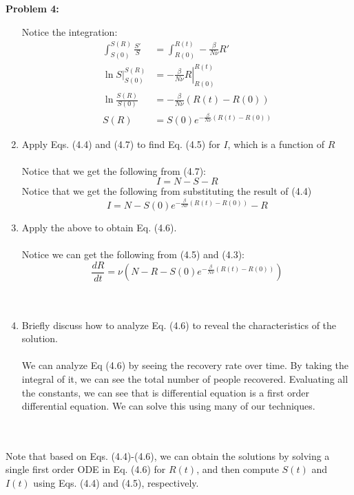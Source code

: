 \documentclass[11pt]{article}
\newenvironment{problem}[1]{\textbf{Problem #1: }}{\newpage}
\begin{document}
\begin{problem}{4}
\begin{enumerate}[label = (\alph*)]
			Notice the integration:
			\begin{align*}
				\int_{S(0)}^{S(R)}\frac{S'}{S} &= \int_{R(0)}^{R(t)}-\frac{\beta}{N \nu}R'\\
				\ln S\bigg|_{S(0)}^{S(R)} &= \left.-\frac{\beta}{N \nu}R\right|_{R(0)}^{R(t)} \\
				\ln \frac{S(R)}{S(0)} &= -\frac{\beta}{N \nu}\left(R(t) - R(0)\right) \\
				S(R) &= S(0)e^{-\frac{\beta}{N \nu}\left(R(t) - R(0)\right)}
			\end{align*}
			\item Apply Eqs. (4.4) and (4.7) to find Eq. (4.5) for $I$, which is a function of $R$
			\\ \\
			Notice that we get the following from (4.7):
			\[I = N - S - R\]
			Notice that we get the following from substituting the result of (4.4)
			\[I = N - S(0)e^{-\frac{\beta}{N \nu}\left(R(t) - R(0)\right)} - R\]
			\item Apply the above to obtain Eq. (4.6).
			\\ \\
			Notice we can get the following from (4.5) and (4.3):
			\[\frac{dR}{dt} = \nu \left(N  - R - S(0)e^{-\frac{\beta}{N \nu}(R(t) - R(0))}\right)\]
			\\ \\
			\item Briefly discuss how to analyze Eq. (4.6) to reveal the characteristics of
			the solution.
			\\ \\
			We can analyze Eq (4.6) by seeing the recovery rate over time.  By taking the integral of it, we can see the total number of people recovered. Evaluating all the constants, we can see that is differential equation is a first order differential equation.  We can solve this using many of our techniques.
			\\ \\ \\
		\end{enumerate}
		Note that based on Eqs. (4.4)-(4.6), we can obtain the solutions by solving
		a single first order ODE in Eq. (4.6) for $R(t)$, and then compute $S(t)$ and
		$I(t)$ using Eqs. (4.4) and (4.5), respectively.
		
		
	\end{problem}
\end{document}
